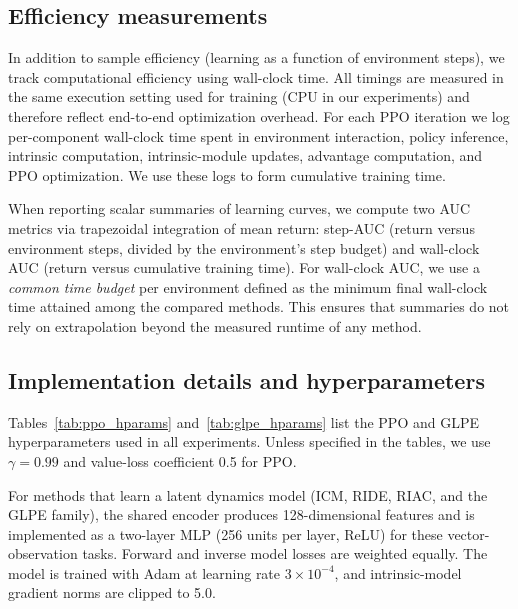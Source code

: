 \subsection{Efficiency measurements}
\label{sec:experimental_setup:efficiency}

In addition to sample efficiency (learning as a function of environment steps), we track computational efficiency using wall-clock time.
All timings are measured in the same execution setting used for training (CPU in our experiments) and therefore reflect end-to-end optimization overhead.
For each PPO iteration we log per-component wall-clock time spent in environment interaction, policy inference, intrinsic computation, intrinsic-module updates, advantage computation, and PPO optimization.
We use these logs to form cumulative training time.

When reporting scalar summaries of learning curves, we compute two AUC metrics via trapezoidal integration of mean return: step-AUC (return versus environment steps, divided by the environment's step budget) and wall-clock AUC (return versus cumulative training time).
For wall-clock AUC, we use a \emph{common time budget} per environment defined as the minimum final wall-clock time attained among the compared methods.
This ensures that summaries do not rely on extrapolation beyond the measured runtime of any method.

\subsection{Implementation details and hyperparameters}
\label{sec:experimental_setup:impl_details}

Tables~\ref{tab:ppo_hparams} and~\ref{tab:glpe_hparams} list the PPO and GLPE hyperparameters used in all experiments.
Unless specified in the tables, we use $\gamma=0.99$ and value-loss coefficient 0.5 for PPO.



For methods that learn a latent dynamics model (ICM, RIDE, RIAC, and the GLPE family), the shared encoder produces 128-dimensional features and is implemented as a two-layer MLP (256 units per layer, ReLU) for these vector-observation tasks.
Forward and inverse model losses are weighted equally.
The model is trained with Adam at learning rate $3\times 10^{-4}$, and intrinsic-model gradient norms are clipped to 5.0.
